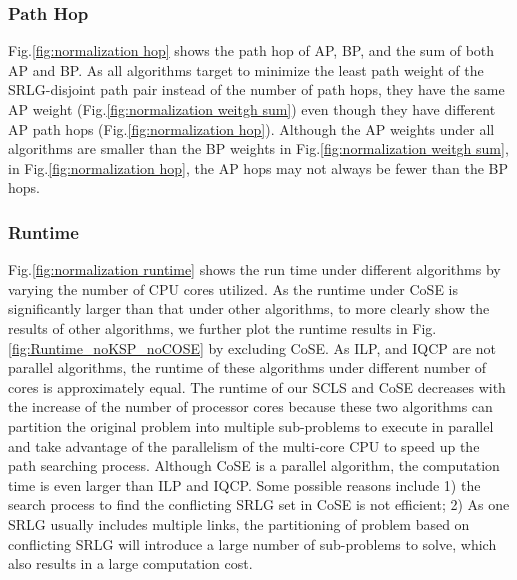 \subsubsection{Path Hop}
Fig.\ref{fig:normalization hop} shows the path hop of AP, BP, and the sum of both AP and BP. As all algorithms target to minimize the least path weight of the SRLG-disjoint path pair instead of the number of path hops, they have the same AP weight (Fig.\ref{fig:normalization weitgh sum}) even though they have different AP path hops (Fig.\ref{fig:normalization hop}). Although the AP weights under all algorithms are smaller than the BP weights in Fig.\ref{fig:normalization weitgh sum}, in Fig.\ref{fig:normalization hop}, the AP hops may not always be fewer than the BP hops.


\subsubsection{Runtime}
\label{subsubsec:Runtime}
Fig.\ref{fig:normalization runtime} shows the run time under different algorithms by varying the number of CPU cores utilized.
As the runtime under CoSE is significantly larger than that under other algorithms, to more clearly show the results of other algorithms, we further plot the runtime results in Fig.\ref{fig:Runtime_noKSP_noCOSE} by excluding CoSE.
As ILP, and IQCP are not parallel algorithms, the runtime of these algorithms under different number of cores is approximately equal. The runtime of our SCLS  and CoSE decreases with the increase of the number of processor cores because these two algorithms can partition the original problem into multiple sub-problems to execute in parallel and take advantage of the parallelism of the multi-core CPU to speed up the path searching process. Although CoSE is a parallel algorithm, the computation time is even larger than  ILP and IQCP. Some possible reasons include 1) the search process to find the conflicting SRLG set in CoSE  is not efficient; 2) As one SRLG usually includes multiple links, the partitioning of problem based on conflicting SRLG will introduce a large number of sub-problems to solve, which also results in a large computation cost.



